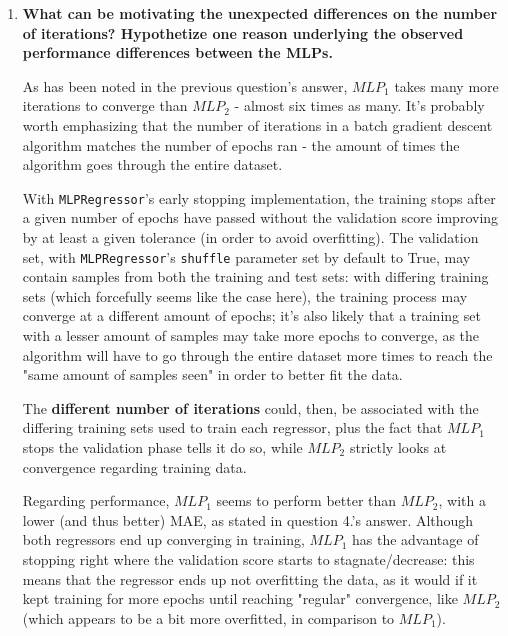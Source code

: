 \documentclass[12pt]{article}
\begin{document}
\begin{enumerate}[leftmargin=\labelsep,resume]
  \item \textbf{What can be motivating the unexpected differences on the number of iterations?
          Hypothetize one reason underlying the observed performance differences between the MLPs.}

        As has been noted in the previous question's answer, $MLP_1$ takes many more
        iterations to converge than $MLP_2$ - almost six times as many. It's probably
        worth emphasizing that the number of iterations in a batch gradient descent
        algorithm matches the number of epochs ran - the amount of times the algorithm goes
        through the entire dataset.

        With \texttt{MLPRegressor}'s early stopping implementation, the training stops
        after a given number of epochs have passed without the validation score
        improving by at least a given tolerance (in order to avoid overfitting).
        The validation set, with \texttt{MLPRegressor}'s \texttt{shuffle} parameter
        set by default to True, may contain samples from both the training and test sets:
        with differing training sets (which forcefully seems like the case here),
        the training process may converge at a different amount of epochs; it's
        also likely that a training set with a lesser amount of samples may
        take more epochs to converge, as the algorithm will have to go through
        the entire dataset more times to reach the "same amount of samples seen"
        in order to better fit the data.

        The \textbf{different number of iterations} could, then, be associated
        with the differing training sets used to train each regressor, plus the
        fact that $MLP_1$ stops the validation phase tells it do so, while $MLP_2$
        strictly looks at convergence regarding training data.

        Regarding performance, $MLP_1$ seems to perform better than $MLP_2$,
        with a lower (and thus better) MAE, as stated in question 4.'s answer.
        Although both regressors end up converging in training, $MLP_1$ has
        the advantage of stopping right where the validation score starts to
        stagnate/decrease: this means that the regressor ends up not overfitting
        the data, as it would if it kept training for more epochs until reaching
        "regular" convergence, like $MLP_2$ (which appears to be a bit more overfitted,
        in comparison to $MLP_1$).


\end{enumerate}
\end{document}
